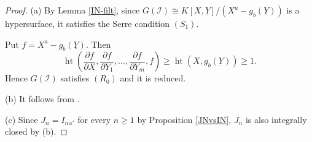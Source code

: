 \documentclass[12pt]{amsart}
\theoremstyle{definition}
\theoremstyle{remark}
\numberwithin{equation}{section}
\DeclareMathOperator{\height}{ht}
\begin{document}
\begin{proof}
(a) By Lemma \ref{IN-filt}, since $G(\mathcal{I}) \cong K[X, \underline{Y}]/(X^a-g_b(\underline{Y}))$ is a hypersurface, it satisfies 
the Serre condition $(S_1)$. 

\par \vspace{1mm}
Put $f=X^a-g_b(\underline{Y})$. 
Then 
\[
\height \left(\frac{\partial f}{\partial X}, 
\frac{\partial f}{\partial Y_1}, \ldots, \frac{\partial f}{\partial Y_m}, f \right) \ge \height (X, g_b(\underbar{Y})) \ge 1.
\] 
Hence $G(\mathcal{I})$ satisfies $(R_0)$ and it is reduced. 
\par \vspace{2mm} \par \noindent 
(b) It follows from \cite[Lemma 3.1]{MMV12}.

\par \vspace{2mm}\par \noindent 
 (c) Since $J_n=I_{n\alpha'}$ for every $n \ge 1$ by Proposition \ref{JNvsIN},  
$J_n$ is also integrally closed by (b). 
 \end{proof}
\end{document}
